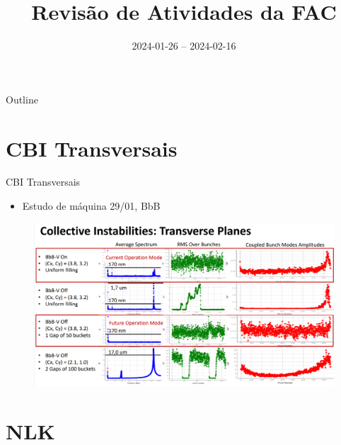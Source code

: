 \documentclass[1610]{beamer}					  %
\title{Revisão de Atividades da FAC}	%
\institute{LNLS.DAC.FAC}				%
\date{2024-01-26 -- 2024-02-16}			%
\begin{document}
\begin{frame}
  \titlepage
  \href{https://github.com/lnls-fac/doc-review-dac-fac}{}
  \href{https://www.overleaf.com/read/sbdjxtzfchrm}{}
\end{frame}

\begin{frame}{Outline}
  \tableofcontents
\end{frame}




\section{CBI Transversais}

\begin{frame}{CBI Transversais}
    \scriptsize{\begin{itemize}
            \item Estudo de máquina 29/01, BbB
    \end{itemize}}
    \begin{figure}[H]
        	\centering
            \includegraphics[width=1.0\textwidth]{2024-02-16/figures/cbi-transversais.png}
            \label{fig:cbi-transversal}
    \end{figure} 
\end{frame}



\section{NLK}
\end{document}
